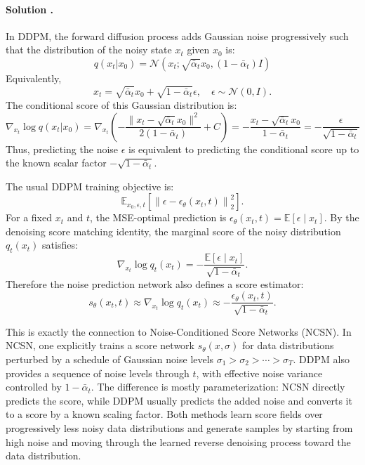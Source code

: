 \documentclass{article}
\newcounter{solutionCount}
\newcommand{\solution}[1]{
    \stepcounter{solutionCount}
    \paragraph{Solution \thesolutionCount.}
    {
        #1
    }
}
\begin{document}
\solution{
    In DDPM, the forward diffusion process adds Gaussian noise progressively such that the distribution of the noisy state $x_t$ given $x_0$ is:
    \begin{equation*}
        q(x_t|x_0) = \mathcal{N}(x_t; \sqrt{\bar{\alpha}_t} x_0, (1 - \bar{\alpha}_t)I)
    \end{equation*}
    Equivalently,
    \begin{equation*}
        x_t = \sqrt{\bar{\alpha}_t} x_0 + \sqrt{1 - \bar{\alpha}_t}\epsilon, \quad \epsilon \sim \mathcal{N}(0, I).
    \end{equation*}
    The conditional score of this Gaussian distribution is:
    \begin{equation*}
        \nabla_{x_t} \log q(x_t|x_0) = \nabla_{x_t} \left( -\frac{\|x_t - \sqrt{\bar{\alpha}_t} x_0\|^2}{2(1 - \bar{\alpha}_t)} + C \right) = - \frac{x_t - \sqrt{\bar{\alpha}_t} x_0}{1 - \bar{\alpha}_t} = - \frac{\epsilon}{\sqrt{1 - \bar{\alpha}_t}}
    \end{equation*}
    Thus, predicting the noise $\epsilon$ is equivalent to predicting the conditional score up to the known scalar factor $-\sqrt{1-\bar{\alpha}_t}$.

    The usual DDPM training objective is:
    \begin{equation*}
        \mathbb{E}_{x_0,\epsilon,t}\left[\left\|\epsilon - \epsilon_\theta(x_t,t)\right\|_2^2\right].
    \end{equation*}
    For a fixed $x_t$ and $t$, the MSE-optimal prediction is $\epsilon_\theta(x_t,t) = \mathbb{E}[\epsilon \mid x_t]$. By the denoising score matching identity, the marginal score of the noisy distribution $q_t(x_t)$ satisfies:
    \begin{equation*}
        \nabla_{x_t}\log q_t(x_t) = -\frac{\mathbb{E}[\epsilon \mid x_t]}{\sqrt{1-\bar{\alpha}_t}}.
    \end{equation*}
    Therefore the noise prediction network also defines a score estimator:
    \begin{equation*}
        s_\theta(x_t,t) \approx \nabla_{x_t}\log q_t(x_t) \approx -\frac{\epsilon_\theta(x_t,t)}{\sqrt{1-\bar{\alpha}_t}}.
    \end{equation*}

    This is exactly the connection to Noise-Conditioned Score Networks (NCSN). In NCSN, one explicitly trains a score network $s_\theta(x,\sigma)$ for data distributions perturbed by a schedule of Gaussian noise levels $\sigma_1 > \sigma_2 > \cdots > \sigma_T$. DDPM also provides a sequence of noise levels through $t$, with effective noise variance controlled by $1-\bar{\alpha}_t$. The difference is mostly parameterization: NCSN directly predicts the score, while DDPM usually predicts the added noise and converts it to a score by a known scaling factor. Both methods learn score fields over progressively less noisy data distributions and generate samples by starting from high noise and moving through the learned reverse denoising process toward the data distribution.
}
\end{document}
